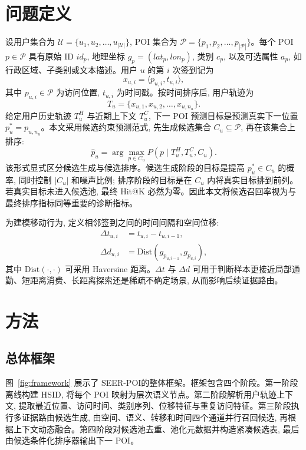 \documentclass[10pt,twocolumn,fontset=none]{ctexart}
\newcommand{\method}{SEER-POI}
\newcommand{\hsid}{HSID}
\begin{document}
\section{问题定义}

设用户集合为 $\mathcal U=\{u_1,u_2,\ldots,u_{|\mathcal U|}\}$, POI 集合为 $\mathcal P=\{p_1,p_2,\ldots,p_{|\mathcal P|}\}$。每个 POI $p\in\mathcal P$ 具有原始 ID $id_p$, 地理坐标 $g_p=(lat_p,lon_p)$, 类别 $c_p$, 以及可选属性 $a_p$, 如行政区域、子类别或文本描述。用户 $u$ 的第 $i$ 次签到记为
\begin{equation}
    x_{u,i}=\langle p_{u,i},t_{u,i}\rangle,
\end{equation}
其中 $p_{u,i}\in\mathcal P$ 为访问位置, $t_{u,i}$ 为时间戳。按时间排序后, 用户轨迹为
\begin{equation}
    T_u=\{x_{u,1},x_{u,2},\ldots,x_{u,n_u}\}.
\end{equation}
给定用户历史轨迹 $T^H_u$ 与近期上下文 $T^C_u$, 下一 POI 预测目标是预测真实下一位置 $p^*_u=p_{u,n_u}$。本文采用候选约束预测范式, 先生成候选集合 $C_u\subseteq\mathcal P$, 再在该集合上排序:
\begin{equation}
    \hat p_u=\arg\max_{p\in C_u} P(p\mid T^H_u,T^C_u,C_u).
\end{equation}
该形式显式区分候选生成与候选排序。候选生成阶段的目标是提高 $p^*_u\in C_u$ 的概率, 同时控制 $|C_u|$ 和噪声比例; 排序阶段的目标是在 $C_u$ 内将真实目标排到前列。若真实目标未进入候选池, 最终 Hit@K 必然为零。因此本文将候选召回率视为与最终排序指标同等重要的诊断指标。

为建模移动行为, 定义相邻签到之间的时间间隔和空间位移:
\begin{align}
    \Delta t_{u,i} &= t_{u,i}-t_{u,i-1},\\
    \Delta d_{u,i} &= \mathrm{Dist}(g_{p_{u,i-1}},g_{p_{u,i}}),
\end{align}
其中 $\mathrm{Dist}(\cdot,\cdot)$ 可采用 Haversine 距离。$\Delta t$ 与 $\Delta d$ 可用于判断样本更接近局部通勤、短距离消费、长距离探索还是稀疏不确定场景, 从而影响后续证据路由。

\section{方法}

\subsection{总体框架}
图~\ref{fig:framework} 展示了 \method 的整体框架。框架包含四个阶段。第一阶段离线构建 \hsid, 将每个 POI 映射为层次语义节点。第二阶段解析用户轨迹上下文, 提取最近位置、访问时间、类别序列、位移特征与重复访问特征。第三阶段执行多证据路由候选生成, 由空间、语义、转移和时间四个通道并行召回候选, 再根据上下文动态融合。第四阶段对候选池去重、池化元数据并构造紧凑候选表, 最后由候选条件化排序器输出下一 POI。
\end{document}
